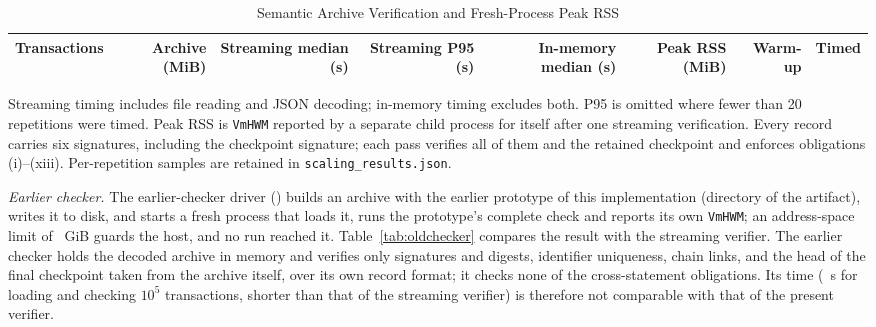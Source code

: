 \begin{table}[!t]
\caption{Semantic Archive Verification and Fresh-Process Peak RSS}
\label{tab:scaling}
\centering
\begin{tabular}{rrrrrrrr}
\toprule
Transactions & Archive (MiB) & Streaming median (s) & Streaming P95 (s) & In-memory median (s) & Peak RSS (MiB) & Warm-up & Timed \\
\midrule

\end{tabular}
\par\smallskip\parbox{\linewidth}{\footnotesize Streaming timing includes file reading and JSON decoding; in-memory timing excludes both. P95 is omitted where fewer than 20 repetitions were timed. Peak RSS is \texttt{VmHWM} reported by a separate child process for itself after one streaming verification. Every record carries six signatures, including the checkpoint signature; each pass verifies all of them and the retained checkpoint and enforces obligations (i)--(xiii). Per-repetition samples are retained in \texttt{scaling\_results.json}.}
\end{table}

\emph{Earlier checker.} The earlier-checker driver () builds an archive with the earlier prototype of this implementation (directory  of the artifact), writes it to disk, and starts a fresh process that loads it, runs the prototype's complete check and reports its own \texttt{VmHWM}; an address-space limit of \OldAsLimitGiB~GiB guards the host, and no run reached it. Table~\ref{tab:oldchecker} compares the result with the streaming verifier. The earlier checker holds the decoded archive in memory and verifies only signatures and digests, identifier uniqueness, chain links, and the head of the final checkpoint taken from the archive itself, over its own record format; it checks none of the cross-statement obligations. Its time (\OldHundredKWall~s for loading and checking $10^5$ transactions, shorter than that of the streaming verifier) is therefore not comparable with that of the present verifier.

